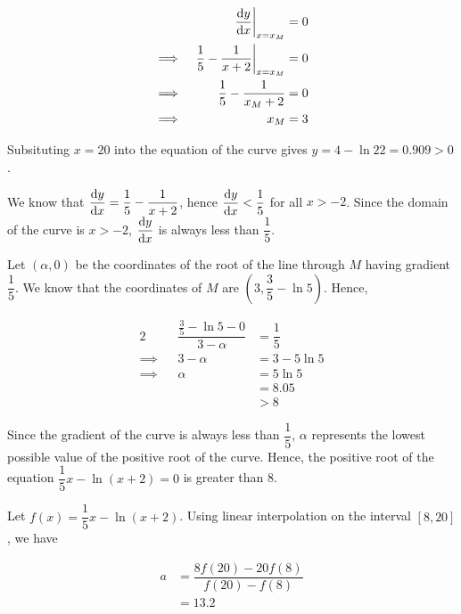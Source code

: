 \documentclass{echw}
\begin{document}
        \begin{alignat*}{2}
            &&\left. \dfrac{\mathrm{d} y}{\mathrm{d} x} \right|_{x = x_M} &= 0\\
            \implies&& \left. \dfrac15 - \dfrac1{x+2}\right|_{x = x_M} &= 0 \\
            \implies&& \dfrac15 - \dfrac1{x_M+2} &= 0 \\
            \implies&& x_M &= 3
        \end{alignat*}


        Subsituting $x=20$ into the equation of the curve gives $y = 4 - \ln{22} = 0.909 > 0$.

        We know that $\dfrac{\mathrm{d} y}{\mathrm{d} x} = \dfrac15 - \dfrac1{x+2}$, hence $\dfrac{\mathrm{d} y}{\mathrm{d} x} < \dfrac15$ for all $x > -2$. Since the domain of the curve is $x > -2$, $\dfrac{\mathrm{d} y}{\mathrm{d} x}$ is always less than $\dfrac15$.

        Let $(\alpha, 0)$ be the coordinates of the root of the line through $M$ having gradient $\dfrac15$. We know that the coordinates of $M$ are $(3, \dfrac35 - \ln5)$. Hence,

        \begin{alignat*}{2}
            &&\dfrac{\tfrac35 - \ln5 - 0}{3 - \alpha} &= \dfrac15 \\
            \implies&& 3 - \alpha &= 3 - 5\ln5 \\
            \implies&& \alpha &= 5\ln5 \\
            && &= 8.05 \\
            && &> 8
        \end{alignat*}

        Since the gradient of the curve is always less than $\dfrac15$, $\alpha$ represents the lowest possible value of the positive root of the curve. Hence, the positive root of the equation $\dfrac15 x - \ln(x+2) = 0$ is greater than 8.

        Let $f(x) = \dfrac15 x - \ln(x+2)$. Using linear interpolation on the interval $[8, 20]$, we have

        \begin{equation*}
            \begin{aligned}
                a &= \dfrac{8f(20) - 20f(8)}{f(20) - f(8)} \\
                &= 13.2
            \end{aligned}
        \end{equation*}

\end{document}
